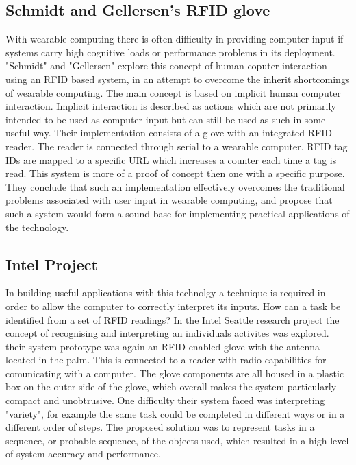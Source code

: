 \documentclass[]{final_report}
\begin{document}
\subsection {Schmidt and Gellersen's RFID glove}

\cite{schmidt}With wearable computing there is often difficulty in providing computer input if systems carry high cognitive loads or performance problems in its deployment. "Schmidt" and "Gellersen"\cite{schmidt} explore this concept of human coputer interaction using an RFID based system, in an attempt to overcome the inherit shortcomings of wearable computing. The main concept is based on implicit \cite{schmidt}human computer interaction. Implicit interaction is described as actions which are not primarily intended to be used as computer input but can still be used as such in some useful way. Their implementation consists of a glove with an integrated RFID reader. The reader is connected through serial to a wearable computer. RFID tag IDs are mapped to a specific URL which increases a counter each time a tag is read. This system is more of a proof of concept then one with a specific purpose. They conclude that such an implementation effectively overcomes the traditional problems associated with user input in wearable computing, and propose that such a system would form a sound base for implementing practical applications of the technology.

\subsection {Intel Project}

In building useful applications with this technolgy a technique is required in order to allow the computer to correctly interpret its inputs. How can a task be identified from a set of RFID readings? In the Intel Seattle research project\cite{intel2} the concept of recognising and interpreting an individuals activites was explored. their system prototype was again an RFID enabled glove with the antenna located in the palm. This is connected to a reader with radio capabilities for comunicating with a computer. The glove components are all housed in a plastic box on the outer side of the glove, which overall makes the system particularly compact and unobtrusive. One difficulty their system faced was interpreting "variety", for example the same task could be completed in different ways or in a different order of steps. The proposed solution was to represent tasks in a sequence, or probable sequence, of the objects used, which resulted in a high level of system accuracy and performance. 
\end{document}
